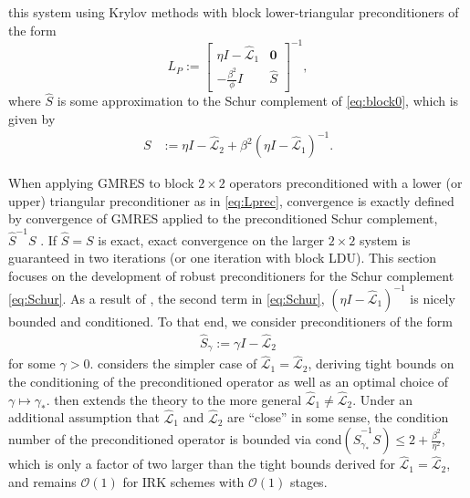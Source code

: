\documentclass[review]{siamart}
\begin{document}
this system using Krylov methods with block lower-triangular preconditioners
of the form
%
\begin{equation}\label{eq:Lprec}
L_P := \begin{bmatrix} \eta I - \widehat{\mathcal{L}}_1 & \mathbf{0} \\ -\frac{\beta^2}{\phi} I
	& \widehat{S}\end{bmatrix}^{-1},
\end{equation}
%
where $\widehat{S}$ is some approximation to the Schur complement of \eqref{eq:block0},
which is given by
%
\begin{align}\label{eq:Schur}
S & := \eta I - \widehat{\mathcal{L}}_2 + \beta^2 (\eta I - \widehat{\mathcal{L}}_1)^{-1}.
\end{align}
%

When applying GMRES to block $2\times 2$ operators preconditioned with a lower
(or upper) triangular preconditioner as in \eqref{eq:Lprec}, convergence
is exactly defined by convergence of GMRES applied to the preconditioned Schur
complement, $\widehat{S}^{-1}S$ \cite{2x2block}. If $\widehat{S} = S$ is exact,
exact convergence on the larger $2\times2$ system is guaranteed in two iterations
(or one iteration with block LDU). This section focuses on the development of
robust preconditioners for the Schur complement \eqref{eq:Schur}. As a result of
, the second term in \eqref{eq:Schur},
$(\eta I - \widehat{\mathcal{L}}_1)^{-1}$ is nicely bounded and conditioned.
To that end, we consider preconditioners of the form
%
\begin{align*}
\widehat{S}_\gamma := \gamma I - \widehat{\mathcal{L}}_2
\end{align*}
%
for some $\gamma > 0$.  considers the simpler case
of $\widehat{\mathcal{L}}_1 = \widehat{\mathcal{L}}_2$, deriving tight bounds
on the conditioning of the preconditioned operator as well as an optimal choice
of $\gamma\mapsto\gamma_*$.  then extends the theory to
the more general $\widehat{\mathcal{L}}_1 \neq \widehat{\mathcal{L}}_2$.
Under an additional assumption that $\widehat{\mathcal{L}}_1$ and
$\widehat{\mathcal{L}}_2$ are ``close'' in some sense, the condition number
of the preconditioned operator is bounded via cond$(\widehat{S}_{\gamma_*}^{-1}S)
\leq 2 + \tfrac{\beta^2}{\eta^2}$, which is only a factor of two larger than
the tight bounds derived for $\widehat{\mathcal{L}}_1 = \widehat{\mathcal{L}}_2$,
and remains $\mathcal{O}(1)$ for IRK schemes with $\mathcal{O}(1)$ stages.
\end{document}
